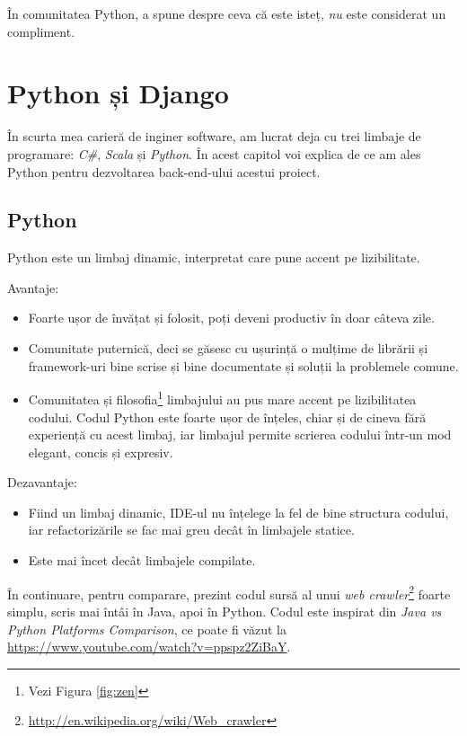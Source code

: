 \begin{savequote}[75mm]
În comunitatea Python, a spune despre ceva că este isteț, \emph{nu} este considerat un compliment.
\end{savequote}

\chapter{Python și Django}

În scurta mea carieră de inginer software, am lucrat deja cu trei limbaje de programare:
\emph{C\#}, \emph{Scala} și \emph{Python}. În acest capitol voi explica de ce am
ales Python pentru dezvoltarea back-end-ului acestui proiect.

\section{Python}

Python este un limbaj dinamic, interpretat care pune accent pe lizibilitate.

Avantaje:
\begin{itemize}
\item Foarte ușor de învățat și folosit, poți deveni productiv în doar câteva zile.
\item Comunitate puternică, deci se găsesc cu ușurință o mulțime de librării și framework-uri bine scrise și bine documentate și soluții la problemele comune.
\item Comunitatea și filosofia\footnote{Vezi Figura \ref{fig:zen}} limbajului au pus mare accent pe lizibilitatea codului.
Codul Python este foarte ușor de înțeles, chiar și de cineva fără experiență
cu acest limbaj, iar limbajul permite scrierea codului într-un mod elegant, concis și expresiv.
\end{itemize}

Dezavantaje:
\begin{itemize}
\item Fiind un limbaj dinamic, IDE-ul nu înțelege la fel de bine structura codului, iar refactorizările se fac mai greu decât în limbajele statice.
\item Este mai încet decât limbajele compilate.
\end{itemize}

În continuare, pentru comparare, prezint codul sursă al unui \emph{web crawler}\footnote{\url{http://en.wikipedia.org/wiki/Web\_crawler}}
foarte simplu, scris mai întâi în Java, apoi în Python. Codul este inspirat
din \emph{Java vs Python Platforms Comparison}, ce poate fi văzut la \url{https://www.youtube.com/watch?v=ppspz2ZiBaY}.


